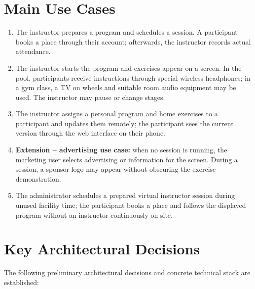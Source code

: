 \documentclass[a4paper,11pt]{article}
\begin{document}
\section{Main Use Cases}

\begin{enumerate}
    \item The instructor prepares a program and schedules a session. A participant books a place through their account; afterwards, the instructor records actual attendance.
    \item The instructor starts the program and exercises appear on a screen. In the pool, participants receive instructions through special wireless headphones; in a gym class, a TV on wheels and suitable room audio equipment may be used. The instructor may pause or change stages.
    \item The instructor assigns a personal program and home exercises to a participant and updates them remotely; the participant sees the current version through the web interface on their phone.
    \item \textbf{Extension -- advertising use case:} when no session is running, the marketing user selects advertising or information for the screen. During a session, a sponsor logo may appear without obscuring the exercise demonstration.
    \item The administrator schedules a prepared virtual instructor session during unused facility time; the participant books a place and follows the displayed program without an instructor continuously on site.
\end{enumerate}

\section{Key Architectural Decisions}

The following preliminary architectural decisions and concrete technical stack are established:
\end{document}
